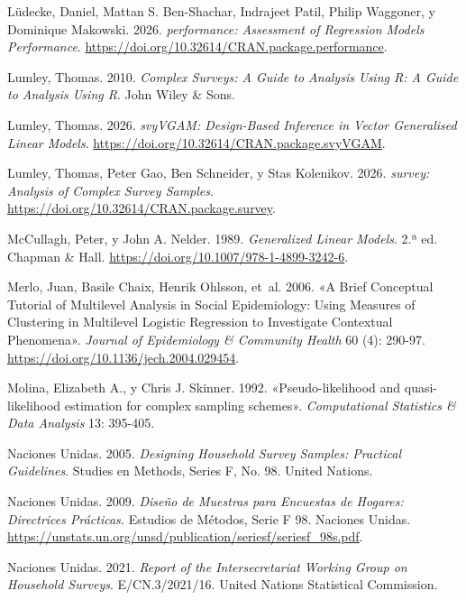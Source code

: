 \documentclass[
  spanish,
  11pt,
  letterpaper,
  oneside,
  open=any]{scrbook}
\newlength{\cslhangindent}
\newenvironment{CSLReferences}[2] %
 {\begin{list}{}{%
  \setlength{\itemindent}{0pt}
  \setlength{\leftmargin}{0pt}
  \setlength{\parsep}{0pt}
  \ifodd #1
   \setlength{\leftmargin}{\cslhangindent}
   \setlength{\itemindent}{-1\cslhangindent}
  \fi
  \setlength{\itemsep}{#2\baselineskip}}}
 {\end{list}}
\begin{document}
\begin{CSLReferences}{1}{1}
Lüdecke, Daniel, Mattan S. Ben-Shachar, Indrajeet Patil, Philip
Waggoner, y Dominique Makowski. 2026. \emph{performance: Assessment of
Regression Models Performance}.
\url{https://doi.org/10.32614/CRAN.package.performance}.

Lumley, Thomas. 2010. \emph{Complex Surveys: A Guide to Analysis Using
R: A Guide to Analysis Using R}. John Wiley \& Sons.

Lumley, Thomas. 2026. \emph{svyVGAM: Design-Based Inference in Vector
Generalised Linear Models}.
\url{https://doi.org/10.32614/CRAN.package.svyVGAM}.

Lumley, Thomas, Peter Gao, Ben Schneider, y Stas Kolenikov. 2026.
\emph{survey: Analysis of Complex Survey Samples}.
\url{https://doi.org/10.32614/CRAN.package.survey}.

McCullagh, Peter, y John A. Nelder. 1989. \emph{Generalized Linear
Models}. 2.ª ed. Chapman \& Hall.
\url{https://doi.org/10.1007/978-1-4899-3242-6}.

Merlo, Juan, Basile Chaix, Henrik Ohlsson, et~al. 2006. {«A Brief
Conceptual Tutorial of Multilevel Analysis in Social Epidemiology: Using
Measures of Clustering in Multilevel Logistic Regression to Investigate
Contextual Phenomena»}. \emph{Journal of Epidemiology \& Community
Health} 60 (4): 290-97. \url{https://doi.org/10.1136/jech.2004.029454}.

Molina, Elizabeth A., y Chris J. Skinner. 1992. {«Pseudo-likelihood and
quasi-likelihood estimation for complex sampling schemes»}.
\emph{Computational Statistics \& Data Analysis} 13: 395-405.

Naciones Unidas. 2005. \emph{Designing Household Survey Samples:
Practical Guidelines}. Studies en Methods, Series F, No. 98. United
Nations.

Naciones Unidas. 2009. \emph{Diseño de Muestras para Encuestas de
Hogares: Directrices Prácticas.} Estudios de Métodos, Serie F 98.
Naciones Unidas.
\url{https://unstats.un.org/unsd/publication/seriesf/seriesf_98s.pdf}.

Naciones Unidas. 2021. \emph{Report of the Intersecretariat Working
Group on Household Surveys}. E/CN.3/2021/16. United Nations Statistical
Commission.


\end{CSLReferences}
\end{document}
